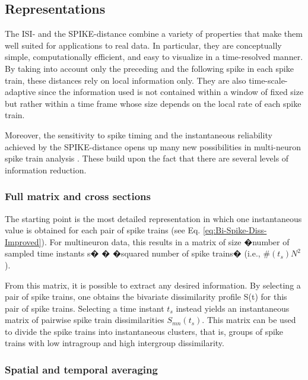 \documentclass[10pt,twocolumn]{elsart5p}
\begin{document}
\subsection{\label{ss:Representations} Representations}

The ISI- and the SPIKE-distance combine a variety of properties that make them well suited for applications to real data. In particular, they are conceptually simple, computationally efficient, and easy to visualize in a time-resolved manner. By taking into account only the preceding and the following spike in each spike train, these distances rely on local information only. They are also time-scale-adaptive since the information used is not contained within a window of fixed size but rather within a time frame whose size depends on the local rate of each spike train.

Moreover, the sensitivity to spike timing and the instantaneous reliability achieved by the SPIKE-distance opens up many new possibilities in multi-neuron spike train analysis \citep{Kreuz13}. These build upon the fact that there are several levels of information reduction.

\subsubsection{\label{sss:Full-matrix-and-cross-sections} Full matrix and cross sections}

The starting point is the most detailed representation in which one instantaneous value is obtained for each pair of spike trains (see Eq. \ref{eq:Bi-Spike-Diss-Improved}). For multineuron data, this results in a matrix of size �number of sampled time instants s� � �squared number of spike trains� (i.e., $\# (t_s) N^2$).

From this matrix, it is possible to extract any desired information. By selecting a pair of spike trains, one obtains the bivariate dissimilarity profile S(t) for this pair of spike trains. Selecting a time instant $t_s$ instead yields an instantaneous matrix of pairwise spike train dissimilarities $S_{mn}(t_s)$. This matrix can be used to divide the spike trains into instantaneous clusters, that is, groups of spike trains with low intragroup and high intergroup dissimilarity.

\subsubsection{\label{sss:Spatial-and-temporal-Averaging} Spatial and temporal averaging}
\end{document}
